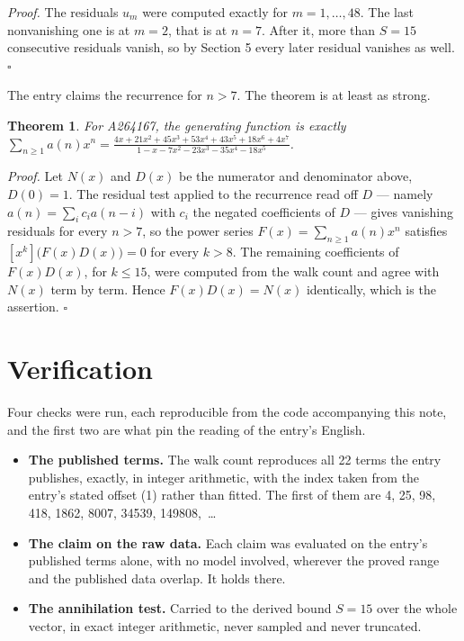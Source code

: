 \documentclass[11pt]{article}
\newtheorem{theorem}{Theorem}
\theoremstyle{definition}
\begin{document}
{\itshape Proof.} The residuals $u_m$ were computed exactly for $m = 1,\dots,48$. The last nonvanishing one is at $m = 2$, that is at $n = 7$. After it, more than $S = 15$ consecutive residuals vanish, so by Section 5 every later residual vanishes as well. $\square$

The entry claims the recurrence for $n > 7$. The theorem is at least as strong.

\begin{theorem} For A264167, the generating function is exactly $\sum_{n\ge 1} a(n)x^n = \frac{4x + 21x^{2} + 45x^{3} + 53x^{4} + 43x^{5} + 18x^{6} + 4x^{7}}{1 - x - 7x^{2} - 23x^{3} - 35x^{4} - 18x^{5}}$.\end{theorem}

{\itshape Proof.} Let $N(x)$ and $D(x)$ be the numerator and denominator above, $D(0)=1$. The residual test applied to the recurrence read off $D$ --- namely $a(n) = \sum_i c_i a(n-i)$ with $c_i$ the negated coefficients of $D$ --- gives vanishing residuals for every $n > 7$, so the power series $F(x)=\sum_{n\ge 1}a(n)x^n$ satisfies $[x^k]\bigl(F(x)D(x)\bigr) = 0$ for every $k > 8$. The remaining coefficients of $F(x)D(x)$, for $k \le 15$, were computed from the walk count and agree with $N(x)$ term by term. Hence $F(x)D(x) = N(x)$ identically, which is the assertion. $\square$

\section{Verification}

Four checks were run, each reproducible from the code accompanying this note, and the first two are what pin the reading of the entry's English.

\begin{itemize}

\item {\bfseries The published terms.} The walk count reproduces all 22 terms the entry publishes, exactly, in integer arithmetic, with the index taken from the entry's stated offset (1) rather than fitted. The first of them are 4, 25, 98, 418, 1862, 8007, 34539, 149808,~\dots

\item {\bfseries The claim on the raw data.} Each claim was evaluated on the entry's published terms alone, with no model involved, wherever the proved range and the published data overlap. It holds there.

\item {\bfseries The annihilation test.} Carried to the derived bound $S = 15$ over the whole vector, in exact integer arithmetic, never sampled and never truncated.

\end{itemize}
\end{document}
